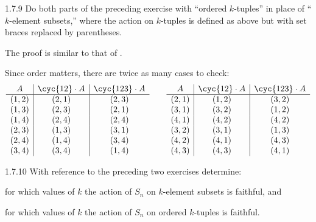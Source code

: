\begin{exercise}{1.7.9}
    Do both parts of the preceding exercise with ``ordered $k$-tuples'' in place of ``$k$-element subsets,'' where the action on $k$-tuples is defined as above but with set braces replaced by parentheses.
    
\end{exercise}

\begin{solenum}
    \item The proof is similar to that of .
    \item Since order matters, there are twice as many cases to check:
    \[
        \begin{array}{c|c|c}
            A & \cyc{1 2} \cdot A & \cyc{1 2 3} \cdot A \\
            \hline
            (1, 2) & (2, 1) & (2, 3) \\
            (1, 3) & (2, 3) & (2, 1) \\
            (1, 4) & (2, 4) & (2, 4) \\
            (2, 3) & (1, 3) & (3, 1) \\
            (2, 4) & (1, 4) & (3, 4) \\
            (3, 4) & (3, 4) & (1, 4)
        \end{array} \qquad
        \begin{array}{c|c|c}
            A & \cyc{1 2} \cdot A & \cyc{1 2 3} \cdot A \\
            \hline
            (2, 1) & (1, 2) & (3, 2) \\
            (3, 1) & (3, 2) & (1, 2) \\
            (4, 1) & (4, 2) & (4, 2) \\
            (3, 2) & (3, 1) & (1, 3) \\
            (4, 2) & (4, 1) & (4, 3) \\
            (4, 3) & (4, 3) & (4, 1) \\
        \end{array}
    \]
\end{solenum}

\begin{exercise}{1.7.10}
    With reference to the preceding two exercises determine:
    \begin{subexercises}
        \item for which values of $k$ the action of $S_n$ on $k$-element subsets is faithful, and
        \item for which values of $k$ the action of $S_n$ on ordered $k$-tuples is faithful.
    \end{subexercises}
\end{exercise}

